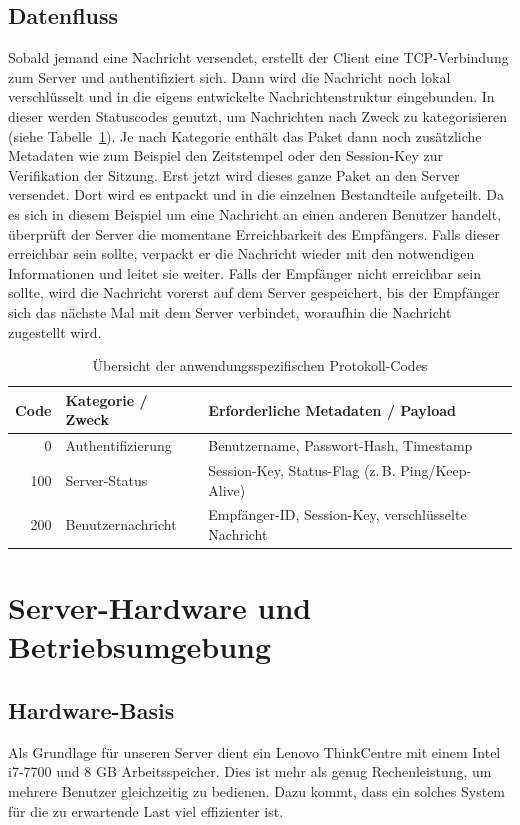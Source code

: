 \subsection{Datenfluss}
Sobald jemand eine Nachricht versendet, erstellt der Client eine TCP-Verbindung zum Server und authentifiziert sich. Dann wird die Nachricht
noch lokal verschlüsselt und in die eigens entwickelte Nachrichtenstruktur eingebunden. In dieser werden Statuscodes genutzt, um Nachrichten 
nach Zweck zu kategorisieren (siehe Tabelle~\ref{tab:protokoll_codes}). Je nach Kategorie enthält das Paket dann noch zusätzliche Metadaten wie 
zum Beispiel den Zeitstempel oder den Session-Key zur Verifikation der Sitzung. Erst jetzt wird dieses ganze Paket an den Server versendet. Dort 
wird es entpackt und in die einzelnen Bestandteile aufgeteilt. Da es sich in diesem Beispiel um eine Nachricht an einen anderen Benutzer handelt, 
überprüft der Server die momentane Erreichbarkeit des Empfängers. Falls dieser erreichbar sein sollte, verpackt er die Nachricht wieder mit den 
notwendigen Informationen und leitet sie weiter. Falls der Empfänger nicht erreichbar sein sollte, wird die Nachricht vorerst auf dem Server 
gespeichert, bis der Empfänger sich das nächste Mal mit dem Server verbindet, woraufhin die Nachricht zugestellt wird.

\begin{table}[htbp]
    \centering
    \caption{Übersicht der anwendungsspezifischen Protokoll-Codes}
    \label{tab:protokoll_codes}
    \begin{tabular}{rll}
        \toprule
        \textbf{Code} & \textbf{Kategorie / Zweck} & \textbf{Erforderliche Metadaten / Payload} \\
        \midrule
        0   & Authentifizierung & Benutzername, Passwort-Hash, Timestamp \\
        100 & Server-Status     & Session-Key, Status-Flag (z.\,B. Ping/Keep-Alive) \\
        200 & Benutzernachricht & Empfänger-ID, Session-Key, verschlüsselte Nachricht \\
        \bottomrule
    \end{tabular}
\end{table}

\section{Server-Hardware und Betriebsumgebung}

\subsection{Hardware-Basis}
Als Grundlage für unseren Server dient ein Lenovo ThinkCentre mit einem Intel i7-7700 und 8 GB Arbeitsspeicher. Dies ist mehr als genug Rechenleistung, 
um mehrere Benutzer gleichzeitig zu bedienen. Dazu kommt, dass ein solches System für die zu erwartende Last viel effizienter ist.

